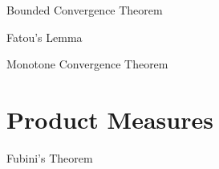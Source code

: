 \begin{theorem}{Bounded Convergence Theorem}{}
    
\end{theorem}

\begin{theorem}{Fatou's Lemma}{}
    
\end{theorem}

\begin{theorem}{Monotone Convergence Theorem}{}
    
\end{theorem}

\section{Product Measures}

\begin{theorem}{Fubini's Theorem}{}
    
\end{theorem}